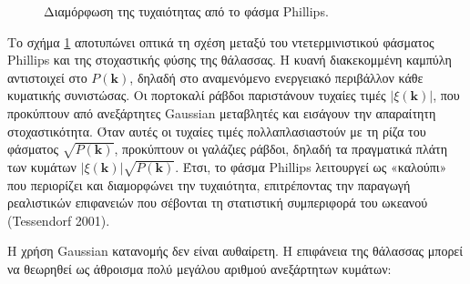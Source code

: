 \documentclass[a4paper, 11pt]{article}
\begin{document}
\begin{figure}[htbp]
\caption{Διαμόρφωση της τυχαιότητας από το φάσμα Phillips.}
\label{fig:phillips_random}
\end{figure}

Το σχήμα \ref{fig:phillips_random} αποτυπώνει οπτικά τη σχέση μεταξύ του
ντετερμινιστικού φάσματος Phillips και της στοχαστικής φύσης της
θάλασσας. Η κυανή διακεκομμένη καμπύλη αντιστοιχεί στο
\(P(\mathbf{k})\), δηλαδή στο αναμενόμενο ενεργειακό περιβάλλον κάθε
κυματικής συνιστώσας. Οι πορτοκαλί ράβδοι παριστάνουν τυχαίες τιμές
\(|\xi(\mathbf{k})|\), που προκύπτουν από ανεξάρτητες Gaussian
μεταβλητές και εισάγουν την απαραίτητη στοχαστικότητα. Όταν αυτές οι
τυχαίες τιμές πολλαπλασιαστούν με τη ρίζα του φάσματος
\(\sqrt{P(\mathbf{k})}\), προκύπτουν οι γαλάζιες ράβδοι, δηλαδή τα
πραγματικά πλάτη των κυμάτων \(|\xi(\mathbf{k})|\sqrt{P(\mathbf{k})}\).
Έτσι, το φάσμα Phillips λειτουργεί ως «καλούπι» που περιορίζει και
διαμορφώνει την τυχαιότητα, επιτρέποντας την παραγωγή ρεαλιστικών
επιφανειών που σέβονται τη στατιστική συμπεριφορά του ωκεανού
(Tessendorf 2001).

Η χρήση Gaussian κατανομής δεν είναι αυθαίρετη. Η επιφάνεια της θάλασσας
μπορεί να θεωρηθεί ως άθροισμα πολύ μεγάλου αριθμού ανεξάρτητων κυμάτων:
\end{document}
